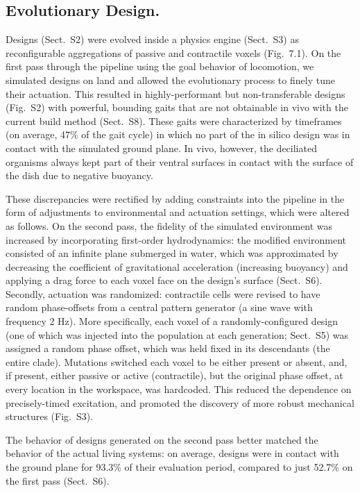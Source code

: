 \subsection*{Evolutionary Design.}  

Designs (Sect.~S2) were evolved inside a physics engine (Sect.~S3) as reconfigurable aggregations of passive and contractile voxels (Fig.~7.1). 
On the first pass through the pipeline using the goal behavior of locomotion, we simulated designs on land and allowed the evolutionary process to finely tune their actuation. 
This resulted in highly-performant but non-transferable designs (Fig.~S2) with powerful, bounding gaits that are not obtainable in vivo with the current build method (Sect.~S8).
These gaits were characterized by timeframes (on average, 47\% of the gait cycle) in which no part of the in silico design was in contact with the simulated ground plane. 
In vivo, however, the deciliated organisms always kept part of their ventral surfaces in contact with the surface of the dish due to negative buoyancy.

These discrepancies were rectified by adding constraints into the pipeline in the form of adjustments to environmental and actuation settings, which were altered as follows. 
On the second pass, the fidelity of the simulated environment was increased by incorporating first-order hydrodynamics: the modified environment consisted of an infinite plane submerged in water, which was approximated by decreasing the coefficient of gravitational acceleration (increasing buoyancy) and applying a drag force to each voxel face on the design's surface (Sect.~S6). 
Secondly, actuation was randomized: contractile cells were revised to have random phase-offsets from a central pattern generator (a sine wave with frequency 2 Hz). 
More specifically, each voxel of a randomly-configured design (one of which was injected into the population at each generation; Sect.~S5) was assigned a random phase offset, which was held fixed in its descendants (the entire clade).
Mutations switched each voxel to be either present or absent, and, if present, either passive or active (contractile), but the original phase offset, at every location in the workspace, was hardcoded. 
This reduced the dependence on precisely-timed excitation, and promoted the discovery of more robust mechanical structures (Fig.~S3).

The behavior of designs generated on the second pass better matched the behavior of the actual living systems: on average, designs were in contact with the ground plane for 93.3\% of their evaluation period, compared to just 52.7\% on the first pass (Sect.~S6).

